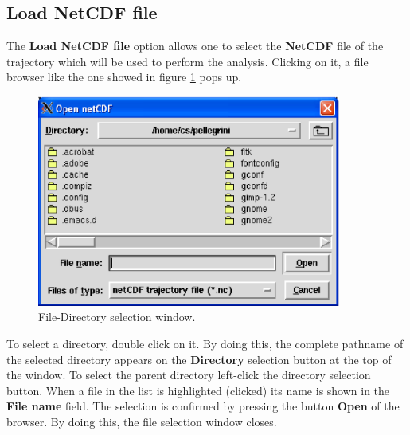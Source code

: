 \documentclass[a4paper,11pt]{report}
\begin{document}
\subsection{Load NetCDF file}
\label{load_netcdf_file}
The \textbf{Load NetCDF file} option allows one to select the \textbf{NetCDF} file
of the trajectory which will be used to perform the analysis. Clicking on it, a file browser like the one showed in figure 
\ref{fig:file_browser} pops up.
\newpage
\begin{figure}[h!]
\begin{center}
\includegraphics[width=10cm]{Figures/file_browser.eps}
\end{center}
\caption[File-Directory selection window]{File-Directory selection window.}
\label{fig:file_browser}
\end{figure}   

To select a directory, double click on it. By doing this, the complete pathname of the selected 
directory appears on the \textbf{Directory} selection button at the top of the window. To select
the parent directory left-click the directory selection button. When a file in the list is highlighted (clicked) 
its name is shown in the \textbf{File name} field. The selection is confirmed by pressing the button \textbf{Open} 
of the browser. By doing this, the file selection window closes.
\end{document}
